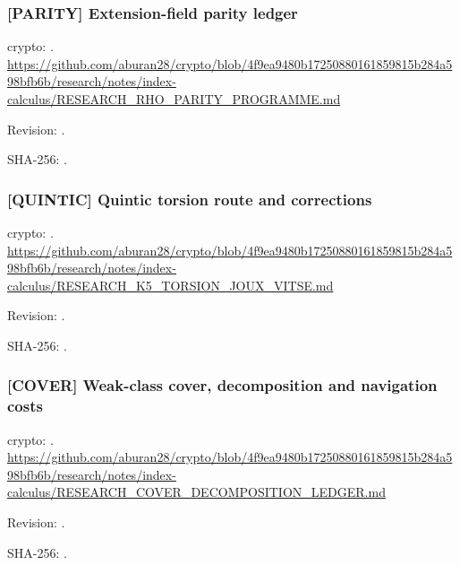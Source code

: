\par\noindent\begin{minipage}{\linewidth}\small
\subsubsection*{[PARITY] Extension-field parity ledger}\label{art:PARITY}
crypto: .
\url{https://github.com/aburan28/crypto/blob/4f9ea9480b17250880161859815b284a598bfb6b/research/notes/index-calculus/RESEARCH_RHO_PARITY_PROGRAMME.md}
\par Revision: .
\par SHA-256: .
\end{minipage}\par\medskip

\par\noindent\begin{minipage}{\linewidth}\small
\subsubsection*{[QUINTIC] Quintic torsion route and corrections}\label{art:QUINTIC}
crypto: .
\url{https://github.com/aburan28/crypto/blob/4f9ea9480b17250880161859815b284a598bfb6b/research/notes/index-calculus/RESEARCH_K5_TORSION_JOUX_VITSE.md}
\par Revision: .
\par SHA-256: .
\end{minipage}\par\medskip

\par\noindent\begin{minipage}{\linewidth}\small
\subsubsection*{[COVER] Weak-class cover, decomposition and navigation costs}\label{art:COVER}
crypto: .
\url{https://github.com/aburan28/crypto/blob/4f9ea9480b17250880161859815b284a598bfb6b/research/notes/index-calculus/RESEARCH_COVER_DECOMPOSITION_LEDGER.md}
\par Revision: .
\par SHA-256: .
\end{minipage}\par\medskip

